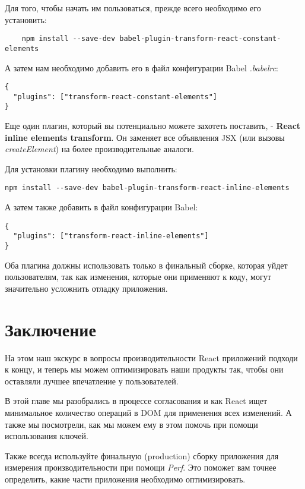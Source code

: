 Для того, чтобы начать им пользоваться, прежде всего необходимо его установить:

\begin{lstlisting}
	npm install --save-dev babel-plugin-transform-react-constant-elements
\end{lstlisting}

А затем нам необходимо добавить его в файл конфигурации Babel \textit{.babelrc}:

\begin{lstlisting}
{
  "plugins": ["transform-react-constant-elements"]
}
\end{lstlisting}

Еще один плагин, который вы потенциально можете захотеть поставить, - \textbf{React inline elements transform}. Он заменяет все объявления JSX (или вызовы \textit{createElement}) на более производительные аналоги.

Для установки плагину необходимо выполнить:

\begin{lstlisting}
npm install --save-dev babel-plugin-transform-react-inline-elements
\end{lstlisting}

А затем также добавить в файл конфигурации Babel:

\begin{lstlisting}
{
  "plugins": ["transform-react-inline-elements"]
}
\end{lstlisting}

Оба плагина должны использовать только в финальный сборке, которая уйдет пользователям, так как изменения, которые они применяют к коду, могут значительно усложнить отладку приложения.

\section{Заключение}

На этом наш экскурс в вопросы производительности React приложений подходи к концу, и теперь мы можем оптимизировать наши продукты так, чтобы они оставляли лучшее впечатление у пользователей.

В этой главе мы разобрались в процессе согласования и как React ищет минимальное количество операций в DOM для применения всех изменений. А также мы посмотрели, как мы можем ему в этом помочь при помощи использования ключей.

Также всегда используйте финальную (production) сборку приложения для измерения производительности при помощи \textit{Perf}. Это поможет вам точнее определить, какие части приложения необходимо оптимизировать.

